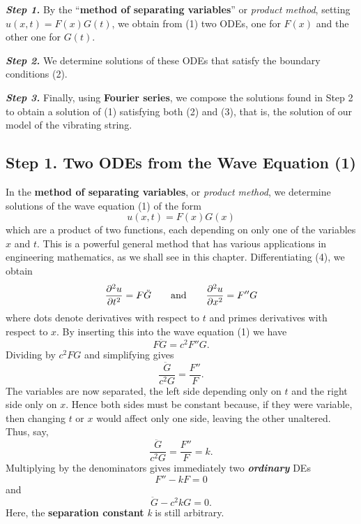 \documentclass[twocolumn, 12pt, leqno, oneside]{amsart}
\begin{document}
\emph{\textbf{Step 1.}} By the “\textbf{method of separating variables}” or
\emph{product method}, setting $u(x,t)=F(x)G(t)$, we obtain from (1) two 
ODEs, one for $F(x)$ and the other one for $G(t)$.

\emph{\textbf{Step 2.}} We determine solutions of these ODEs that satisfy 
the boundary conditions (2).

\emph{\textbf{Step 3.}} Finally, using \textbf{Fourier series}, we compose 
the solutions found in Step 2 to obtain a solution of (1) satisfying both 
(2) and (3), that is, the solution of our model of the vibrating string.

\subsection{Step 1. Two ODEs from the Wave Equation (1)}

In the \textbf{method of separating variables}, or \emph{product method}, we 
determine solutions of the wave equation (1) of the form
\begin{equation}
    u(x, t) = F(x)G(x)
\end{equation}
which are a product of two functions, each depending on only one of the 
variables $x$ and $t$. This is a powerful general method that has various 
applications in engineering mathematics, as we shall see in this chapter. 
Differentiating (4), we obtain
\begin{equation}
  \nonumber
    \frac{ \partial^2{u} }{ \partial{t^2} } = F\ddot{G} \qquad \text{and} \\
        \qquad \frac{ \partial^2{u} }{ \partial{x^2} } = F''G
\end{equation}
where dots denote derivatives with respect to $t$ and primes derivatives with
respect to $x$. By inserting this into the wave equation (1) we have
\begin{equation}
  \nonumber
    F\ddot{G} = c^2F''G.
\end{equation}
Dividing by $c^2FG$ and simplifying gives
\begin{equation}
  \nonumber
    \frac{\ddot{G}}{c^2G} = \frac{F''}{F}.
\end{equation}
The variables are now separated, the left side depending only on $t$ and the 
right side only on $x$. Hence both sides must be constant because, if they 
were variable, then changing $t$ or $x$ would affect only one side, leaving 
the other unaltered. Thus, say,
\begin{equation}
  \nonumber
    \frac{\ddot{G}}{c^2G} = \frac{F''}{F} = k.
\end{equation}
Multiplying by the denominators gives immediately two \emph{\textbf{ordinary}} 
DEs
\begin{equation}
    F'' - kF = 0
\end{equation}
and
\begin{equation}
    \ddot{G} - c^2kG = 0.
\end{equation}
Here, the \textbf{separation constant} \emph{k} is still arbitrary.
\end{document}
